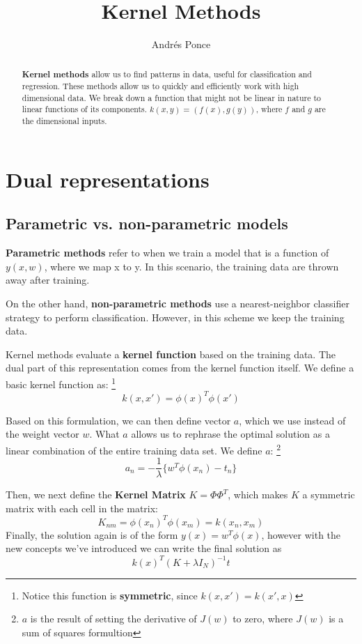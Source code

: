\documentclass{tufte-handout}
\title{Kernel Methods}
\author{Andr\'es Ponce}
\begin{document}
\maketitle
\begin{abstract}

\textbf{Kernel methods} allow us to find
patterns in data, useful for classification
and regression. These methods allow us to quickly
and efficiently work with high dimensional data.
We break down a function that might not be linear
in nature to linear functions of its components. 
$k(x,y) = (f(x), g(y))$, where $f$ and $g$ are the 
dimensional inputs.
\end{abstract}

\section{Dual representations}
	\subsection{Parametric vs. non-parametric models}
	\textbf{Parametric methods} refer to when we train a model that
	is a function of $y(x, w)$, where we map x to y. In this scenario,
	the training data are thrown away after training.

	On the other hand, \textbf{non-parametric methods} use a nearest-neighbor
	classifier strategy to perform classification. However, in this scheme we 
	keep the training data.
	
	Kernel methods evaluate a \textbf{kernel function} based on the training
	data. The dual part of this representation comes from the kernel function
	itself. We define a basic kernel function as: \footnote{Notice this function 
	is \textbf{symmetric}, since $k(x, x') = k(x', x)$}
	\[k(x, x') = \phi(x)^{T}\phi(x')\]

	Based on this formulation, we can then define vector $a$, which we use instead
	of the weight vector $w$. What $a$ allows us to rephrase the optimal solution
	as a linear combination of the entire training data set. We define $a$:
	\footnote{$a$ is the result of setting the derivative of $J(w)$ to zero, where $J(w)$
	is a sum of squares formultion}
	\[a_{n} = -\frac{1}{\lambda}\{w^{T}\phi(x_{n}) - t_{n}\}\]

	Then, we next define the \textbf{Kernel Matrix} $K = \Phi\Phi^{T}$, which makes $K$ a
	symmetric matrix with each cell in the matrix:
	\[ K_{nm} = \phi(x_{n})^{T}\phi(x_{m}) = k(x_{n}, x_{m})\]
	Finally, the solution again is of the form $y(x) = w^{T}\phi(x)$, however with the 
	new concepts we've introduced we can write the final solution as
	\[k(x)^{T}(K + \lambda I_{N})^{-1}t\]
\end{document}
